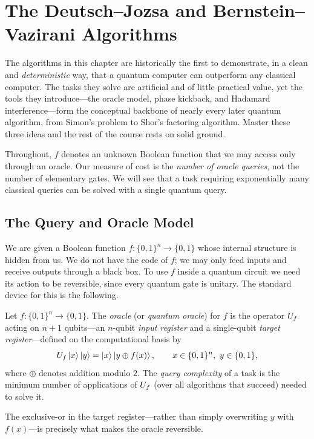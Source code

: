 \chapter{The Deutsch--Jozsa and Bernstein--Vazirani Algorithms}

The algorithms in this chapter are historically the first to demonstrate, in a
clean and \emph{deterministic} way, that a quantum computer can outperform any
classical computer. The tasks they solve are artificial and of little practical
value, yet the tools they introduce---the oracle model, phase kickback, and
Hadamard interference---form the conceptual backbone of nearly every later
quantum algorithm, from Simon's problem to Shor's factoring algorithm. Master
these three ideas and the rest of the course rests on solid ground.

Throughout, $f$ denotes an unknown Boolean function that we may access only
through an oracle. Our measure of cost is the \emph{number of oracle queries},
not the number of elementary gates. We will see that a task requiring
exponentially many classical queries can be solved with a single quantum query.

\section{The Query and Oracle Model}

We are given a Boolean function $f:\{0,1\}^n\to\{0,1\}$ whose internal structure
is hidden from us. We do not have the code of $f$; we may only feed inputs and
receive outputs through a black box. To use $f$ inside a quantum circuit we need
its action to be reversible, since every quantum gate is unitary. The standard
device for this is the following.

\begin{definition}
\label{l3:def:oracle}
Let $f:\{0,1\}^n\to\{0,1\}$. The \emph{oracle} (or \emph{quantum oracle}) for $f$
is the operator $U_f$ acting on $n+1$ qubits---an $n$-qubit \emph{input register}
and a single-qubit \emph{target register}---defined on the computational basis by
\[
  U_f\ket{x}\ket{y}=\ket{x}\ket{y\oplus f(x)},
  \qquad x\in\{0,1\}^n,\ y\in\{0,1\},
\]
where $\oplus$ denotes addition modulo $2$. The \emph{query complexity} of a task
is the minimum number of applications of $U_f$ (over all algorithms that succeed)
needed to solve it.
\end{definition}

The exclusive-or in the target register---rather than simply overwriting $y$ with
$f(x)$---is precisely what makes the oracle reversible.


